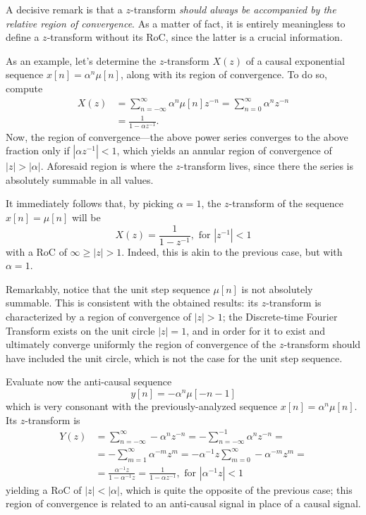 \documentclass[\documentfontsize, twocolumn]{\classname}
\begin{document}
A decisive remark is that a $z$-transform \emph{should always be accompanied by the relative region of convergence}. As a matter of fact, it is entirely meaningless to define a $z$-transform without its RoC, since the latter is a crucial information.

As an example, let's determine the $z$-transform $X(z)$ of a causal exponential sequence $x[n] = \alpha^n \mu[n]$, along with its region of convergence. To do so, compute
\begin{align*}
    X(z) &= \sum_{n=-\infty}^\infty \alpha^n \mu[n] z^{-n} = \sum_{n=0}^\infty \alpha^n z^{-n}\\
         &= \frac{1}{1 - \alpha z^{-1}}.
\end{align*}
Now, the region of convergence---the above power series converges to the above fraction only if $\left|\alpha z^{-1}\right| < 1$, which yields an annular region of convergence of $|z| > |\alpha|$. Aforesaid region is where the $z$-transform lives, since there the series is absolutely summable in all values.

It immediately follows that, by picking $\alpha = 1$, the $z$-transform of the sequence $x[n] = \mu[n]$ will be
\[
    X(z) = \frac {1} {1 - z^{-1}}, \mbox{ for } \left|z^{-1}\right| < 1
\]
with a RoC of $\infty \geq |z| > 1$. Indeed, this is akin to the previous case, but with $\alpha = 1$.

Remarkably, notice that the unit step sequence $\mu[n]$ is not absolutely summable. This is consistent with the obtained results: its $z$-transform is characterized by a region of convergence of $|z| > 1$; the Discrete-time Fourier Transform exists on the unit circle $|z| = 1$, and in order for it to exist and ultimately converge uniformly the region of convergence of the $z$-transform should have included the unit circle, which is not the case for the unit step sequence.

Evaluate now the anti-causal sequence
\[
    y[n] = -\alpha^n \mu[-n-1]
\]
which is very consonant with the previously-analyzed sequence $x[n] = \alpha^n
\mu[n]$. Its $z$-transform is
\begin{align*}
    Y(z)
    &= \sum_{n=-\infty}^{\infty} -\alpha^n z^{-n} = -\sum_{n=-\infty}^{-1} \alpha^n z^{-n} =\\
    &= -\sum_{m=1}^{\infty} \alpha^{-m} z^{m} = -\alpha^{-1}z \sum_{m=0}^{\infty} -\alpha^{-m} z^{m} =\\
    &= \frac{\alpha^{-1}z}{1 - \alpha^{-1}z} = \frac{1}{1 - \alpha z^{-1}}, \mbox{ for } \left|\alpha^{-1} z\right| < 1
\end{align*}
yielding a RoC of $|z| < |\alpha|$, which is quite the opposite of the previous case; this region of convergence is related to an anti-causal signal in place of a causal signal.
\end{document}
